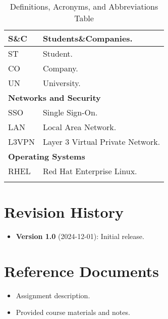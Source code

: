 \begin{longtable}{|l|p{}|}
      \hline
      S\&C             & Students\&Companies.                              \\
      \hline
      ST               & Student.                                          \\
      \hline
      CO               & Company.                                          \\
      \hline
      UN               & University.                                       \\
      \hline
      \multicolumn{2}{|l|}{\textbf{Networks and Security}}                 \\
      \hline
      SSO              & Single Sign-On.                                   \\
      \hline
      LAN              & Local Area Network.                               \\
      \hline
      L3VPN            & Layer 3 Virtual Private Network.                  \\
      \hline
      \multicolumn{2}{|l|}{\textbf{Operating Systems}}                     \\
      \hline
      RHEL             & Red Hat Enterprise Linux.                         \\
      \hline
      \caption{Definitions, Acronyms, and Abbreviations Table}
      \label{tab:definitions-acronyms-abbreviations}
\end{longtable}

\section{Revision History}
\label{sec:revision-history}%

\begin{itemize}
      \item \textbf{Version 1.0} (2024-12-01): Initial release.
\end{itemize}

\section{Reference Documents}
\label{sec:reference-documents}%

\begin{itemize}
      \item Assignment description.
      \item Provided course materials and notes.
\end{itemize}

